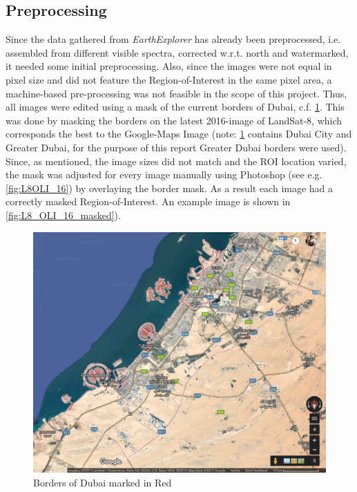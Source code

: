 \subsection{Preprocessing}
\label{subsec:pre}
Since the data gathered from \textit{EarthExplorer} has already been preprocessed, i.e. assembled from different visible spectra, corrected w.r.t. north and watermarked, it needed some initial preprocessing. Also, since the images were not equal in pixel size and did not feature the Region-of-Interest in the same pixel area, a machine-based pre-processing was not feasible in the scope of this project. Thus, all images were edited using a mask of the current borders of Dubai, c.f. \cref{fig:borders}. This was done by masking the borders on the latest 2016-image of LandSat-8, which corresponds the best to the Google-Maps Image (note: \cref{fig:borders} contains Dubai City and Greater Dubai, for the purpose of this report Greater Dubai borders were used). Since, as mentioned, the image sizes did not match and the ROI location varied, the mask was adjusted for every image manually using Photoshop (see e.g. \cref{fig:L8OLI_16}) by overlaying the border mask. As a result each image had a correctly masked Region-of-Interest. An example image is shown in \cref{fig:L8_OLI_16_masked}).
\begin{figure}[h!]
	\centering
	\includegraphics[width=\textwidth]{images/google_dubai.png}
	\caption{Borders of Dubai marked in Red\citep{googlemaps}}
	\label{fig:borders}
\end{figure}
